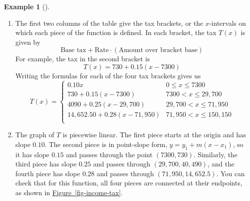 \documentclass[10pt,]{book}
\theoremstyle{plain}
\theoremstyle{definition}
\theoremstyle{definition}
\theoremstyle{definition}
\newtheorem{example}[theorem]{Example}
\theoremstyle{definition}
\theoremstyle{definition}
\numberwithin{equation}{section}
\newcommand{\alert}[1]{\mathbf{\color{magenta}{#1}}}
\newcommand{\lt}{ < }
\newcommand{\amp}{ & }
\begin{document}
\begin{example}[]
\begin{enumerate}[label=*\alph**]
            The income \(x = 40,000\) is in the third bracket, so the tax is 
            \begin{equation*}T (\alert{40,000}) = 4090 + 0.25(\alert{40,000} − 29,700) = 6665\end{equation*}\item\hypertarget{li-339}{}
            The first two columns of the table give the tax brackets, or the \(x\)-intervals on which each piece of the function is defined. In each bracket, the tax \(T(x)\) is given by 
            \begin{equation*}\text{Base tax} + \text{Rate}\cdot(\text{Amount over bracket base}) \end{equation*}
            For example, the tax in the second bracket is 
            \begin{equation*}T (x) = 730 + 0.15(x − 7300)\end{equation*}
            Writing the formulas for each of the four tax brackets gives us
            \begin{equation*}
                T(x) =
                \begin{cases}
                0.10x \amp  0 \le x \le 7300\\
                730 + 0.15(x − 7300)  \amp  7300\lt x\le 29,700\\
                4090 + 0.25(x − 29,700) \amp  29,700\lt x\le 71,950\\
                14,652.50 + 0.28(x − 71,950)\amp 71,950\lt x\le 150,150\\
                \end{cases}
            \end{equation*}\item\hypertarget{li-340}{}
            The graph of \(T\) is piecewise linear. The first piece starts at the origin and has slope \(0.10\). The second piece is in point-slope form, \(y = y_1 + m(x − x_1)\), so it has slope \(0.15\) and passes through the point \((7300, 730)\). Similarly, the third piece has slope \(0.25\) and passes through \((29,700, 40,490)\), and the fourth piece has slope \(0.28\) and passes through \((71,950, 14,652.5)\). You can check that for this function, all four pieces are connected at their endpoints, as shown in \hyperref[fig-income-tax]{Figure~\ref{fig-income-tax}}.
            \leavevmode%
\begin{figure}
\centering

\end{figure}
\end{enumerate}
\end{example}
\end{document}
